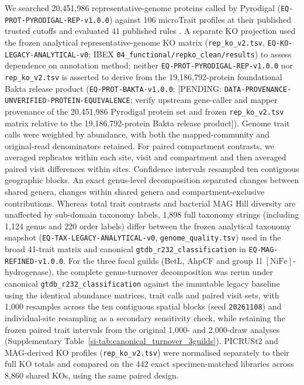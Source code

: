 {We searched 20,451,986 representative-genome proteins called by Pyrodigal (\texttt{EQ-\allowbreak PROT-\allowbreak PYRODIGAL-\allowbreak REP-\allowbreak v1.0.0}) against 106 microTrait profiles at their published trusted cutoffs and evaluated 41 published rules \cite{karaoz2022microtrait}. A separate KO projection used the frozen analytical representative-genome KO matrix (\texttt{rep\_\allowbreak ko\_\allowbreak v2.tsv}, \texttt{EQ-\allowbreak KO-\allowbreak LEGACY-\allowbreak ANALYTICAL-\allowbreak v0}; IBEX \texttt{04\_\allowbreak functional/\allowbreak repko\_\allowbreak clean/\allowbreak results}) to assess dependence on annotation method; neither \texttt{EQ-\allowbreak PROT-\allowbreak PYRODIGAL-\allowbreak REP-\allowbreak v1.0.0} nor \texttt{rep\_\allowbreak ko\_\allowbreak v2.tsv} is asserted to derive from the 19,186,792-protein foundational Bakta release product (\texttt{EQ-\allowbreak PROT-\allowbreak BAKTA-\allowbreak v1.0.0}; [PENDING: \texttt{DATA-\allowbreak PROVENANCE-\allowbreak UNVERIFIED-\allowbreak PROTEIN-\allowbreak EQUIVALENCE}; verify upstream gene-caller and mapper provenance of the 20,451,986 Pyrodigal protein set and frozen \texttt{rep\_\allowbreak ko\_\allowbreak v2.tsv} matrix relative to the 19,186,792-protein Bakta release product]). Genome trait calls were weighted by abundance, with both the mapped-community and original-read denominators retained. For paired compartment contrasts, we averaged replicates within each site, visit and compartment and then averaged paired visit differences within sites. Confidence intervals resampled ten contiguous geographic blocks. An exact genus-level decomposition separated changes between shared genera, changes within shared genera and compartment-exclusive contributions. Whereas total trait contrasts and bacterial MAG Hill diversity are unaffected by sub-domain taxonomy labels, 1,898 full taxonomy strings (including 1,124 genus and 220 order labels) differ between the frozen analytical taxonomy snapshot (\texttt{EQ-\allowbreak TAX-\allowbreak LEGACY-\allowbreak ANALYTICAL-\allowbreak v0}, \texttt{genome\_\allowbreak quality.tsv}) used in the broad 41-trait matrix and canonical \texttt{gtdb\_\allowbreak r232\_\allowbreak classification} in \texttt{EQ-\allowbreak MAG-\allowbreak REFINED-\allowbreak v1.0.0}. For the three focal guilds (BetL, AhpCF and group 1l $[\mathrm{NiFe}]$-hydrogenase), the complete genus-turnover decomposition was rerun under canonical \texttt{gtdb\_\allowbreak r232\_\allowbreak classification} against the immutable legacy baseline using the identical abundance matrices, trait calls and paired visit sets, with 1,000 resamples across the ten contiguous spatial blocks (seed \texttt{20261108}) and individual-site resampling as a secondary sensitivity check, while retaining the frozen paired trait intervals from the original 1,000- and 2,000-draw analyses (Supplementary Table~\ref{si-tab:canonical_turnover_3guilds}). PICRUSt2 and MAG-derived KO profiles (\texttt{rep\_\allowbreak ko\_\allowbreak v2.tsv}) were normalised separately to their full KO totals and compared on the 442 exact specimen-matched libraries across 8,860 shared KOs, using the same paired design.
\par}

